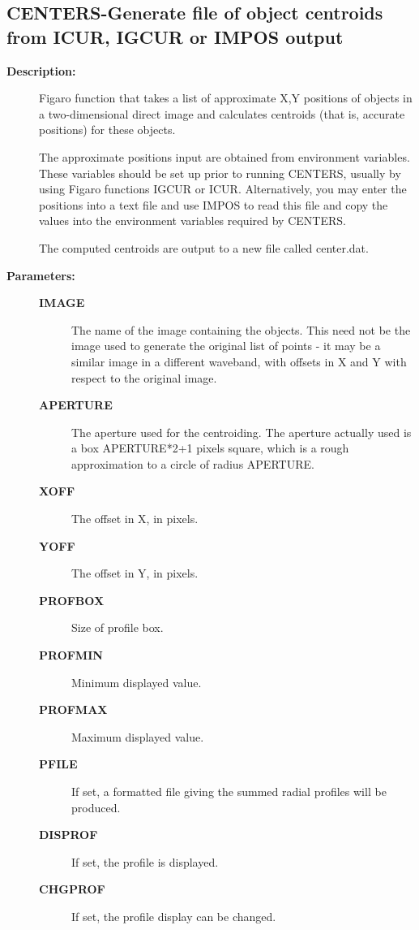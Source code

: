 \subsection{CENTERS-\label{CENTERS}Generate file of object centroids from ICUR, IGCUR or IMPOS output}
\begin{description}

\item [\textbf{Description:}]
 Figaro function that takes a list of approximate X,Y positions
 of objects in a two-dimensional direct image and calculates
 centroids (that is, accurate positions) for these objects.

 The approximate positions input are obtained from environment
 variables.  These variables should be set up prior to running
 CENTERS, usually by using Figaro functions IGCUR or ICUR.
 Alternatively, you may enter the positions into a text file and use
 IMPOS to read this file and copy the values into the environment
 variables required by CENTERS.

 The computed centroids are output to a new file called center.dat.

\item [\textbf{Parameters:}]
\begin{description}
\item [\textbf{IMAGE}]
 The name of the image containing the objects.  This need not be the
 image used to generate the original list of points - it may be a
 similar image in a different waveband, with offsets in X and Y with
 respect to the original image.
\item [\textbf{APERTURE}]
 The aperture used for the centroiding.  The aperture actually used is
 a box APERTURE*2+1 pixels square, which is a rough approximation to a
 circle of radius APERTURE.
\item [\textbf{XOFF}]
 The offset in X, in pixels.
\item [\textbf{YOFF}]
 The offset in Y, in pixels.
\item [\textbf{PROFBOX}]
 Size of profile box.
\item [\textbf{PROFMIN}]
 Minimum displayed value.
\item [\textbf{PROFMAX}]
 Maximum displayed value.
\item [\textbf{PFILE}]
 If set, a formatted file giving the summed radial profiles will
 be produced.
\item [\textbf{DISPROF}]
 If set, the profile is displayed.
\item [\textbf{CHGPROF}]
 If set, the profile display can be changed.
\end{description}


\end{description}
